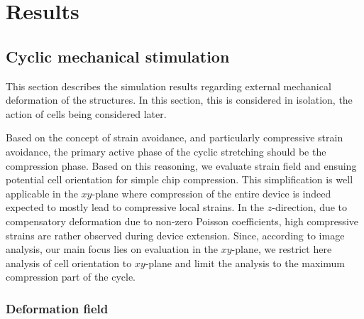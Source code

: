 \documentclass[11pt]{amsart}
\begin{document}
\section{Results}

\subsection{Cyclic mechanical stimulation}

This section describes the simulation results regarding external mechanical deformation of the structures. In this section, this is considered in isolation, the action of cells being considered later.

Based on the concept of strain avoidance, and particularly compressive strain avoidance, the primary active phase of the cyclic stretching should be the compression phase. Based on this reasoning, we evaluate strain field and ensuing potential cell orientation for simple chip compression. This simplification is well applicable in the $xy$-plane where compression of the entire device is indeed expected to mostly lead to compressive local strains. In the $z$-direction, due to compensatory deformation due to non-zero Poisson coefficients, high compressive strains are rather observed during device extension. Since, according to image analysis, our main focus lies on evaluation in the $xy$-plane, we restrict here analysis of cell orientation to $xy$-plane and limit the analysis to the maximum compression part of the cycle.

\subsubsection{Deformation field}


\begin{figure}
\end{figure}
\end{document}
